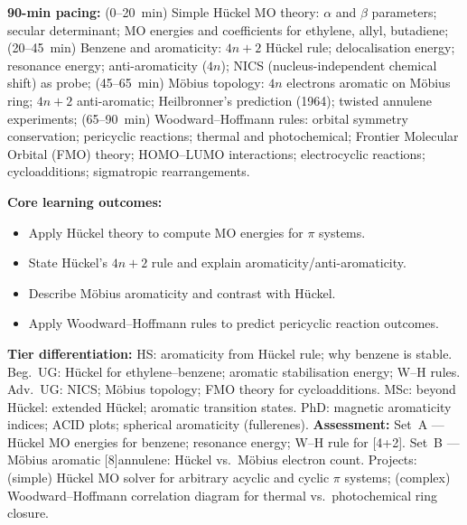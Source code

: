\documentclass[11pt,a4paper]{article}
\begin{document}
\begin{tcolorbox}[chembox, title={Module~III.3 --- Lecture L07: H\"uckel and M\"obius Aromaticity}]
\textbf{90-min pacing:} (0--20~min) Simple H\"uckel MO theory: $\alpha$ and $\beta$ parameters; secular determinant; MO energies and coefficients for ethylene, allyl, butadiene; (20--45~min) Benzene and aromaticity: $4n+2$ H\"uckel rule; delocalisation energy; resonance energy; anti-aromaticity ($4n$); NICS (nucleus-independent chemical shift) as probe; (45--65~min) M\"obius topology: $4n$ electrons aromatic on M\"obius ring; $4n+2$ anti-aromatic; Heilbronner's prediction (1964); twisted annulene experiments; (65--90~min) Woodward--Hoffmann rules: orbital symmetry conservation; pericyclic reactions; thermal and photochemical; Frontier Molecular Orbital (FMO) theory; HOMO--LUMO interactions; electrocyclic reactions; cycloadditions; sigmatropic rearrangements.

\medskip\textbf{Core learning outcomes:}
\begin{itemize}[leftmargin=1.4em,topsep=2pt,itemsep=1pt]
  \item Apply H\"uckel theory to compute MO energies for $\pi$ systems.
  \item State H\"uckel's $4n+2$ rule and explain aromaticity/anti-aromaticity.
  \item Describe M\"obius aromaticity and contrast with H\"uckel.
  \item Apply Woodward--Hoffmann rules to predict pericyclic reaction outcomes.
\end{itemize}
\medskip\textbf{Tier differentiation:}
HS: aromaticity from H\"uckel rule; why benzene is stable.
Beg.\ UG: H\"uckel for ethylene--benzene; aromatic stabilisation energy; W--H rules.
Adv.\ UG: NICS; M\"obius topology; FMO theory for cycloadditions.
MSc: beyond H\"uckel: extended H\"uckel; aromatic transition states.
PhD: magnetic aromaticity indices; ACID plots; spherical aromaticity (fullerenes).
\medskip\textbf{Assessment:}
Set~A --- H\"uckel MO energies for benzene; resonance energy; W--H rule for [4+2].
Set~B --- M\"obius aromatic [8]annulene: H\"uckel vs.\ M\"obius electron count.
Projects: (simple) H\"uckel MO solver for arbitrary acyclic and cyclic $\pi$ systems; (complex) Woodward--Hoffmann correlation diagram for thermal vs.\ photochemical ring closure.
\end{tcolorbox}

\medskip
\end{document}
